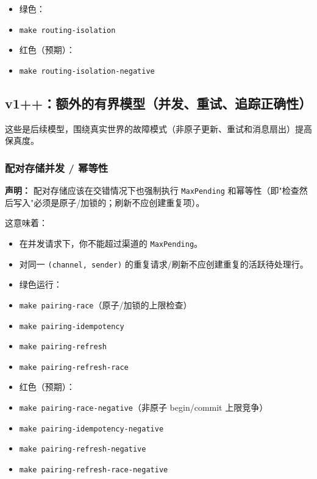 \begin{itemize}
  \item 绿色：
  \item \texttt{make routing-isolation}
  \item 红色（预期）：
  \item \texttt{make routing-isolation-negative}
\end{itemize}


\subsection{v1++：额外的有界模型（并发、重试、追踪正确性）}


这些是后续模型，围绕真实世界的故障模式（非原子更新、重试和消息扇出）提高保真度。

\subsubsection{配对存储并发 / 幂等性}


\textbf{声明：} 配对存储应该在交错情况下也强制执行 \texttt{MaxPending} 和幂等性（即"检查然后写入"必须是原子/加锁的；刷新不应创建重复项）。

这意味着：

\begin{itemize}
  \item 在并发请求下，你不能超过渠道的 \texttt{MaxPending}。
  \item 对同一 \texttt{(channel, sender)} 的重复请求/刷新不应创建重复的活跃待处理行。
\end{itemize}


\begin{itemize}
  \item 绿色运行：
  \item \texttt{make pairing-race}（原子/加锁的上限检查）
  \item \texttt{make pairing-idempotency}
  \item \texttt{make pairing-refresh}
  \item \texttt{make pairing-refresh-race}
  \item 红色（预期）：
  \item \texttt{make pairing-race-negative}（非原子 begin/commit 上限竞争）
  \item \texttt{make pairing-idempotency-negative}
  \item \texttt{make pairing-refresh-negative}
  \item \texttt{make pairing-refresh-race-negative}
\end{itemize}


